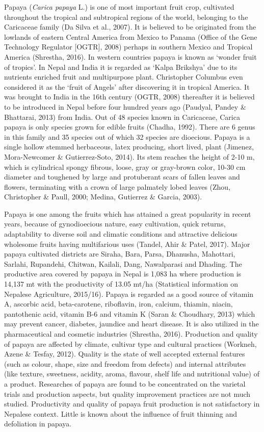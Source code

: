 \documentclass[]{article}
\begin{document}
Papaya (\emph{Carica papaya} L.) is one of most important fruit crop,
cultivated throughout the tropical and subtropical regions of the world,
belonging to the Caricaceae family (Da Silva et al., 2007). It is
believed to be originated from the lowlands of eastern Central America
from Mexico to Panama (Office of the Gene Technology Regulator
{[}OGTR{]}, 2008) perhaps in southern Mexico and Tropical America
(Shrestha, 2016). In western countries papaya is known as `wonder fruit
of tropics'. In Nepal and India it is regarded as `Kalpa Brikshya' due
to its nutrients enriched fruit and multipurpose plant. Christopher
Columbus even considered it as the `fruit of Angels' after discovering
it in tropical America. It was brought to India in the 16th century
(OGTR, 2008) thereafter it is believed to be introduced in Nepal before
four hundred years ago (Paudyal, Pandey \& Bhattarai, 2013) from India.
Out of 48 species known in Caricaceae, Carica papaya is only species
grown for edible fruits (Chadha, 1992). There are 6 genus in this family
and 35 species out of which 32 species are dioecious. Papaya is a single
hollow stemmed herbaceous, latex producing, short lived, plant (Jimenez,
Mora-Newcomer \& Gutierrez-Soto, 2014). Its stem reaches the height of
2-10 m, which is cylindrical spongy fibrous, loose, gray or gray-brown
color, 10-30 cm diameter and toughened by large and protuberant scars of
fallen leaves and flowers, terminating with a crown of large palmately
lobed leaves (Zhou, Christopher \& Paull, 2000; Medina, Gutierrez \&
Garcia, 2003).

Papaya is one among the fruits which has attained a great popularity in
recent years, because of gynodioecious nature, easy cultivation, quick
returns, adaptability to diverse soil and climatic conditions and
attractive delicious wholesome fruits having multifarious uses (Tandel,
Ahir \& Patel, 2017). Major papaya cultivated districts are Siraha,
Bara, Parsa, Dhanusha, Mahottari, Sarlahi, Rupandehi, Chitwan, Kailali,
Dang, Nawalparasi and Dhading. The productive area covered by papaya in
Nepal is 1,083 ha where production is 14,137 mt with the productivity of
13.05 mt/ha (Statistical information on Nepalese Agriculture, 2015/16).
Papaya is regarded as a good source of vitamin A, ascorbic acid,
beta-carotene, riboflavin, iron, calcium, thiamin, niacin, pantothenic
acid, vitamin B-6 and vitamin K (Saran \& Choudhary, 2013) which may
prevent cancer, diabetes, jaundice and heart disease. It is also
utilized in the pharmaceutical and cosmetic industries (Shrestha, 2016).
Production and quality of papaya are affected by climate, cultivar type
and cultural practices (Workneh, Azene \& Tesfay, 2012). Quality is the
state of well accepted external features (such as colour, shape, size
and freedom from defects) and internal attributes (like texture,
sweetness, acidity, aroma, flavour, shelf life and nutritional value) of
a product. Researches of papaya are found to be concentrated on the
varietal trials and production aspects, but quality improvement
practices are not much studied. Productivity and quality of papaya fruit
production is not satisfactory in Nepalese context. Little is known
about the influence of fruit thinning and defoliation in papaya.
\end{document}
